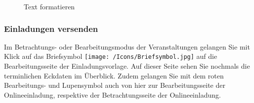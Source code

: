 \begin{figure}[H]
\caption{Text formatieren}
\end{figure}

\subsubsection{Einladungen versenden}

Im Betrachtungs- oder Bearbeitungsmodus der Veranstaltungen gelangen Sie mit Klick auf das Briefsymbol \texttt{[image: /Icons/Briefsymbol.jpg]} auf die Bearbeitungsseite der Einladungsvorlage. Auf dieser Seite sehen Sie nochmals die terminlichen Eckdaten im Überblick. Zudem gelangen Sie mit dem roten Bearbeitungs- und Lupensymbol auch von hier zur Bearbeitungsseite der Onlineeinladung, respektive der Betrachtungsseite der Onlineeinladung. \\

